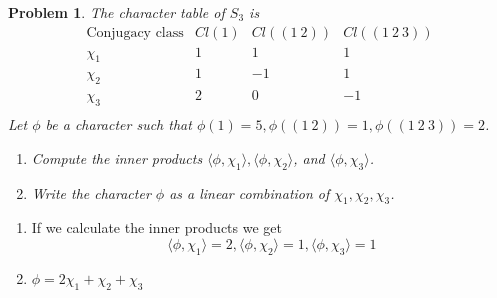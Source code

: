 \documentclass[10pt]{article}
\theoremstyle{plain}
\newtheorem{problem}{Problem}
\theoremstyle{remark}
\begin{document}
\begin{problem}
  The character table of $S_3$ is
  \[
    \begin{array}{c|ccc}
      \text{Conjugacy class} & Cl(1) & Cl((1\ 2)) & Cl((1\ 2\ 3))\\
      \hline
      \chi_1 & 1 & 1 & 1\\
      \chi_2 & 1 & -1 & 1\\
      \chi_3 & 2 & 0 & -1\\
    \end{array}
  \]
  Let $\phi$ be a character such that
  $\phi(1)=5,\phi((1\ 2))=1,\phi((1\ 2\ 3))=2$.
  \begin{enumerate}
  \item[(a)] Compute the inner products
    $\langle \phi,\chi_1\rangle,\langle \phi,\chi_2\rangle$,
    and $\langle \phi,\chi_3\rangle$.
  \item[(b)] Write the character $\phi$ as a linear combination of
    $\chi_1,\chi_2,\chi_3$.
  \end{enumerate}
\end{problem}

\begin{enumerate}
\item[(a)] If we calculate the inner products we get
  \[
    \langle \phi,\chi_1\rangle=2, \langle\phi,\chi_2\rangle=1, \langle\phi,\chi_3\rangle=1
  \]
\item[(b)] $\phi=2\chi_1+\chi_2+\chi_3$
\end{enumerate}
\end{document}
